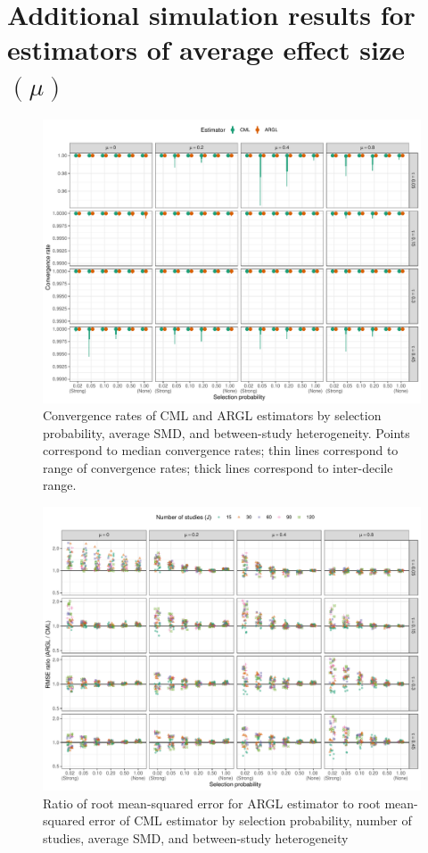 \documentclass[
  man, donotrepeattitle,floatsintext]{apa7}
\begin{document}
\section{\texorpdfstring{Additional simulation results for estimators of average effect size \((\mu)\)}{Additional simulation results for estimators of average effect size (\textbackslash mu)}}\label{mu-simulation-results}

\begin{figure}
\includegraphics{selection_models_draft_files/figure-latex/convergence-rates-1} \caption{Convergence rates of CML and ARGL estimators by selection probability, average SMD, and between-study heterogeneity. Points correspond to median convergence rates; thin lines correspond to range of convergence rates; thick lines correspond to inter-decile range.}\label{fig:convergence-rates}
\end{figure}

\begin{figure}
\includegraphics{selection_models_draft_files/figure-latex/rmse-ARGL-CML-1} \caption{Ratio of root mean-squared error for ARGL estimator to root mean-squared error of CML estimator by selection probability, number of studies, average SMD, and between-study heterogeneity}\label{fig:rmse-ARGL-CML}
\end{figure}
\end{document}
